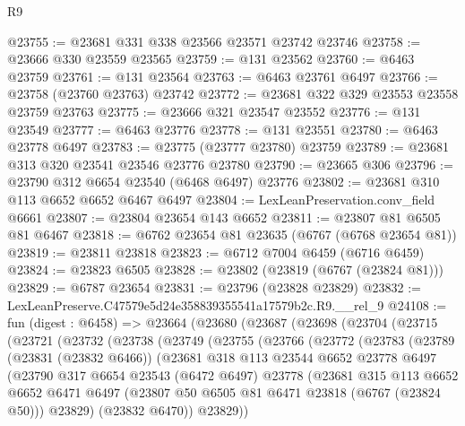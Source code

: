 \begin{lexlean}{R9}
\begin{coremodule}
@23755 := @23681 @331 @338 @23566 @23571 @23742 @23746
@23758 := @23666 @330 @23559 @23565
@23759 := @131 @23562
@23760 := @6463 @23759
@23761 := @131 @23564
@23763 := @6463 @23761 @6497
@23766 := @23758 (@23760 @23763) @23742
@23772 := @23681 @322 @329 @23553 @23558 @23759 @23763
@23775 := @23666 @321 @23547 @23552
@23776 := @131 @23549
@23777 := @6463 @23776
@23778 := @131 @23551
@23780 := @6463 @23778 @6497
@23783 := @23775 (@23777 @23780) @23759
@23789 := @23681 @313 @320 @23541 @23546 @23776 @23780
@23790 := @23665 @306
@23796 := @23790 @312 @6654 @23540 (@6468 @6497) @23776
@23802 := @23681 @310 @113 @6652 @6652 @6467 @6497
@23804 := LexLeanPreservation.conv_field @6661
@23807 := @23804 @23654 @143 @6652
@23811 := @23807 @81 @6505 @81 @6467
@23818 := @6762 @23654 @81 @23635 (@6767 (@6768 @23654 @81))
@23819 := @23811 @23818
@23823 := @6712 @7004 @6459 (@6716 @6459)
@23824 := @23823 @6505
@23828 := @23802 (@23819 (@6767 (@23824 @81)))
@23829 := @6787 @23654
@23831 := @23796 (@23828 @23829)
@23832 := LexLeanPreserve.C47579e5d24e358839355541a17579b2c.R9.__rel_9
@24108 := fun (digest : @6458) =>
  @23664
    (@23680
      (@23687
        (@23698
          (@23704
            (@23715
              (@23721
                (@23732
                  (@23738
                    (@23749
                      (@23755
                        (@23766
                          (@23772
                            (@23783
                              (@23789
                                (@23831 (@23832 @6466))
                                (@23681
                                  @318
                                  @113
                                  @23544
                                  @6652
                                  @23778
                                  @6497
                                  (@23790
                                    @317
                                    @6654
                                    @23543
                                    (@6472 @6497)
                                    @23778
                                    (@23681
                                      @315
                                      @113
                                      @6652
                                      @6652
                                      @6471
                                      @6497
                                      (@23807 @50 @6505 @81 @6471 @23818 (@6767 (@23824 @50)))
                                      @23829)
                                    (@23832 @6470))
                                  @23829))

\end{coremodule}
\end{lexlean}
